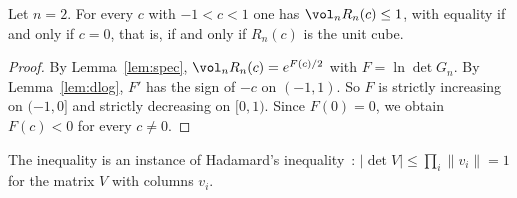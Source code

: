 \begin{theorem}\label{thm:main}
Let $n=2$. For every $c$ with $-1<c<1$ one has $\vol_nR_n(c)\le1$, with equality if and only if $c=0$, that is, if and only if $R_n(c)$ is the unit cube.
\end{theorem}
\begin{proof}
By Lemma~\ref{lem:spec}, $\vol_nR_n(c)=e^{F(c)/2}$ with $F=\ln\det G_n$.
By Lemma~\ref{lem:dlog}, $F'$ has the sign of $-c$ on $(-1,1)$.
So $F$ is strictly increasing on $(-1,0]$ and strictly decreasing on $[0,1)$.
Since $F(0)=0$, we obtain $F(c)<0$ for every $c\ne0$.
\end{proof}
\begin{remark}
The inequality is an instance of Hadamard's inequality~\cite{hadamard}: $|\det V|\le\prod_i\|v_i\|=1$ for the matrix $V$ with columns $v_i$.
\end{remark}
